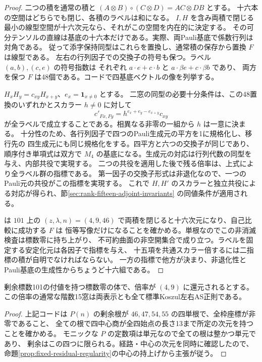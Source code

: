 \begin{proof}
二つの積を通常の積と $(A\otimes B)\circ(C\otimes D)=AC\otimes DB$ とする。
十六本の空間はどちらでも閉じ、各積のラベルは和になる。
$I,H$ を含み両積で閉じる最小の線型空間が十六次元なら、それがこの空間を内在的に決定する。
その可分テンソルの直線は基底の十六本だけである。実際、両Pauli基底で係数行列は対角である。
従って添字保持同型はこれらを置換し、通常積の保存から置換 $F$ は線型である。
左右の行列因子での交換子の符号も保つ。ラベル $(a,b),(c,e)$ の符号指数は
それぞれ $a\cdot e+c\cdot b$ と $a\cdot\beta e+c\cdot\beta b$ であり、
両方を保つ $F$ は48個である。コードで四基底ベクトルの像を列挙する。

$H_xH_y=c_{xy}H_{x+y}$、$e_x=\boldsymbol1_{x\ne0}$ とする。
二窓の同型の必要十分条件は、この48置換のいずれかとスカラー $h\ne0$ に対して
\[
 c'_{Fx,Fy}=h^{e_x+e_y-e_{x+y}}c_{xy}
\]
が全ラベルで成立することである。相異なる非零の一組から $h$ は一意に決まる。
十分性のため、各行列因子で四つのPauli生成元の平方を1に規格化し、移行先の
四生成元にも同じ規格化をする。四平方と六つの交換子が同じであり、
順序付き単項式は双方で $M_4$ の基底になる。生成元の対応は行列代数の同型を与え、内部共役で実現する。
二つの共役を適用した後で残る倍率は、上式により全ラベル群の指標である。
第一因子の交換子形式は非退化なので、一つのPauli元の共役がこの指標を実現する。
これで $H,H'$ のスカラーと独立共役による対応が得られ、節\ref{sec:rank-fifteen-adjoint-invariants}
の同値条件が適用される。

 は $101$ 上の
$(z,\lambda,n)=(4,9,46)$ で両積を閉じると十六次元になり、自己比較に成功する $F$ は
恒等写像だけになることを確かめる。単根なのでこの非消滅検査は標数零に持ち上がり、
不可約曲面の非空開集合で成り立つ。ラベルを固定する安定化元は各因子で指標を与え、
十五項を共通スカラー倍するには二指標の積が自明でなければならない。
一方の指標で他方が決まり、非退化性とPauli基底の生成性からちょうど十六組である。
\end{proof}
\begin{corollary}\label{cor:rank-fifteen-interior-101}
剰余標数101の付値を持つ標数零の体で、倍率が $(4,9)$ に還元されるとする。
この倍率の通常な階数15窓は両表示とも全て標準Koszul左右AS正則である。
\end{corollary}
\begin{proof}
上記コードは $P(n)$ の剰余根が $46,47,54,55$ の四単根で、全枠座標が非零であること、
全ての根で四中心商が全四始点の長さ13まで所定の次元を持つことを確かめる。
モニックな $P$ の定数項は単元なので全ての根は整かつ単元であり、
剰余はこの四つに限られる。経路・中心の次元を同時に確認したので、
命題\ref{prop:fixed-residual-regularity}の中心の持上げから主張が従う。
\end{proof}

